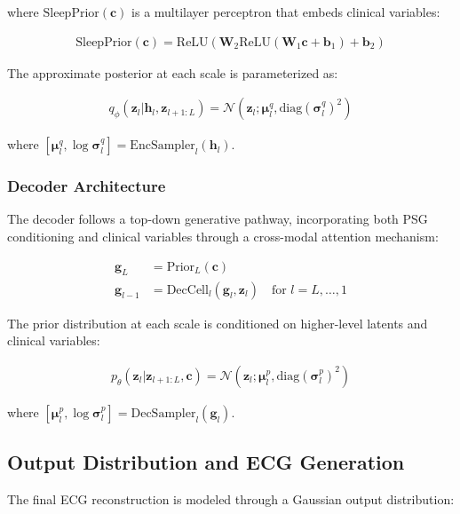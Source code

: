 \documentclass[11pt]{article}
\begin{document}
where $\text{SleepPrior}(\mathbf{c})$ is a multilayer perceptron that embeds clinical variables:

\begin{align}
\text{SleepPrior}(\mathbf{c}) = \text{ReLU}(\mathbf{W}_2 \text{ReLU}(\mathbf{W}_1 \mathbf{c} + \mathbf{b}_1) + \mathbf{b}_2)
\end{align}

The approximate posterior at each scale is parameterized as:

\begin{align}
q_\phi(\mathbf{z}_l | \mathbf{h}_l, \mathbf{z}_{l+1:L}) = \mathcal{N}(\mathbf{z}_l; \boldsymbol{\mu}_l^q, \text{diag}(\boldsymbol{\sigma}_l^q)^2)
\end{align}

where $[\boldsymbol{\mu}_l^q, \log \boldsymbol{\sigma}_l^q] = \text{EncSampler}_l(\mathbf{h}_l)$.

\subsubsection{Decoder Architecture}

The decoder follows a top-down generative pathway, incorporating both PSG conditioning and clinical variables through a cross-modal attention mechanism:

\begin{align}
\mathbf{g}_L &= \text{Prior}_L(\mathbf{c}) \\
\mathbf{g}_{l-1} &= \text{DecCell}_l(\mathbf{g}_l, \mathbf{z}_l) \quad \text{for } l = L, \ldots, 1
\end{align}

The prior distribution at each scale is conditioned on higher-level latents and clinical variables:

\begin{align}
p_\theta(\mathbf{z}_l | \mathbf{z}_{l+1:L}, \mathbf{c}) = \mathcal{N}(\mathbf{z}_l; \boldsymbol{\mu}_l^p, \text{diag}(\boldsymbol{\sigma}_l^p)^2)
\end{align}

where $[\boldsymbol{\mu}_l^p, \log \boldsymbol{\sigma}_l^p] = \text{DecSampler}_l(\mathbf{g}_l)$.

\subsection{Output Distribution and ECG Generation}

The final ECG reconstruction is modeled through a Gaussian output distribution:
\end{document}
